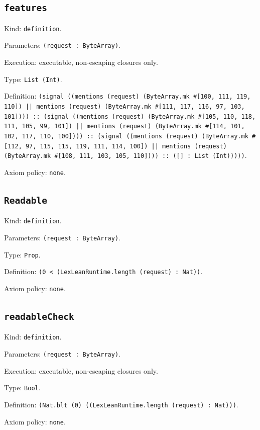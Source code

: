 \documentclass[11pt]{article}
\begin{document}
\subsection*{\texttt{features}}
\noindent Kind: \texttt{definition}.\par
\noindent Parameters: \texttt{(request : ByteArray)}.\par
\noindent Execution: executable, non-escaping closures only.\par
\noindent Type: \texttt{List (Int)}.\par
\noindent Definition: \texttt{(signal ((mentions (request) (ByteArray.mk \#[100, 111, 119, 110]) || mentions (request) (ByteArray.mk \#[111, 117, 116, 97, 103, 101]))) :: (signal ((mentions (request) (ByteArray.mk \#[105, 110, 118, 111, 105, 99, 101]) || mentions (request) (ByteArray.mk \#[114, 101, 102, 117, 110, 100]))) :: (signal ((mentions (request) (ByteArray.mk \#[112, 97, 115, 115, 119, 111, 114, 100]) || mentions (request) (ByteArray.mk \#[108, 111, 103, 105, 110]))) :: ([] : List (Int)))))}.\par
\noindent Axiom policy: \texttt{none}.\par
\subsection*{\texttt{Readable}}
\noindent Kind: \texttt{definition}.\par
\noindent Parameters: \texttt{(request : ByteArray)}.\par
\noindent Type: \texttt{Prop}.\par
\noindent Definition: \texttt{(0 < (LexLeanRuntime.length (request) : Nat))}.\par
\noindent Axiom policy: \texttt{none}.\par
\subsection*{\texttt{readableCheck}}
\noindent Kind: \texttt{definition}.\par
\noindent Parameters: \texttt{(request : ByteArray)}.\par
\noindent Execution: executable, non-escaping closures only.\par
\noindent Type: \texttt{Bool}.\par
\noindent Definition: \texttt{(Nat.blt (0) ((LexLeanRuntime.length (request) : Nat)))}.\par
\noindent Axiom policy: \texttt{none}.\par
\end{document}
